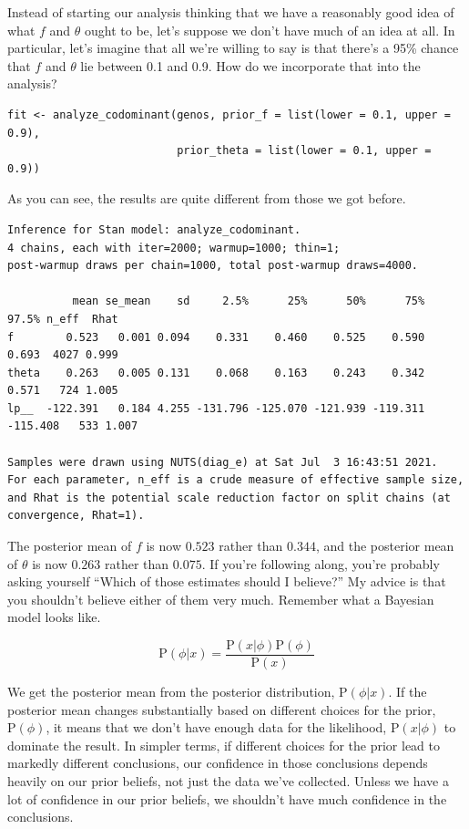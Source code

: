 \documentclass[12pt]{article}
\begin{document}
Instead of starting our analysis thinking that we have a reasonably
good idea of what $f$ and $\theta$ ought to be, let's suppose we don't
have much of an idea at all. In particular, let's imagine that all
we're willing to say is that there's a 95\% chance that $f$ and
$\theta$ lie between 0.1 and 0.9. How do we incorporate that into the
analysis?

\begin{verbatim}
fit <- analyze_codominant(genos, prior_f = list(lower = 0.1, upper = 0.9), 
                          prior_theta = list(lower = 0.1, upper = 0.9))
\end{verbatim}
As you can see, the results are quite different from those we got
before.

{\small
\begin{verbatim}
Inference for Stan model: analyze_codominant.
4 chains, each with iter=2000; warmup=1000; thin=1; 
post-warmup draws per chain=1000, total post-warmup draws=4000.

          mean se_mean    sd     2.5%      25%      50%      75%    97.5% n_eff  Rhat
f        0.523   0.001 0.094    0.331    0.460    0.525    0.590    0.693  4027 0.999
theta    0.263   0.005 0.131    0.068    0.163    0.243    0.342    0.571   724 1.005
lp__  -122.391   0.184 4.255 -131.796 -125.070 -121.939 -119.311 -115.408   533 1.007

Samples were drawn using NUTS(diag_e) at Sat Jul  3 16:43:51 2021.
For each parameter, n_eff is a crude measure of effective sample size,
and Rhat is the potential scale reduction factor on split chains (at 
convergence, Rhat=1).
\end{verbatim}
}

The posterior mean of $f$ is now $0.523$ rather than $0.344$, and the
posterior mean of $\theta$ is now $0.263$ rather than $0.075$. If
you're following along, you're probably asking yourself ``Which of
those estimates should I believe?'' My advice is that you shouldn't
believe either of them very much. Remember what a Bayesian model looks
like.

$$
\mbox{P}(\phi|x) = \frac{\mbox{P}(x|\phi)\mbox{P}(\phi)}{\mbox{P}(x)}
$$

\noindent We get the posterior mean from the posterior distribution,
$\mbox{P}(\phi|x)$. If the posterior mean changes substantially based
on different choices for the prior, $\mbox{P}(\phi)$, it means that we
don't have enough data for the likelihood, $\mbox{P}(x|\phi)$ to
dominate the result. In simpler terms, if different choices for the
prior lead to markedly different conclusions, our confidence in those
conclusions depends heavily on our prior beliefs, not just the data
we've collected. Unless we have a lot of confidence in our prior
beliefs, we shouldn't have much confidence in the conclusions.
\end{document}
